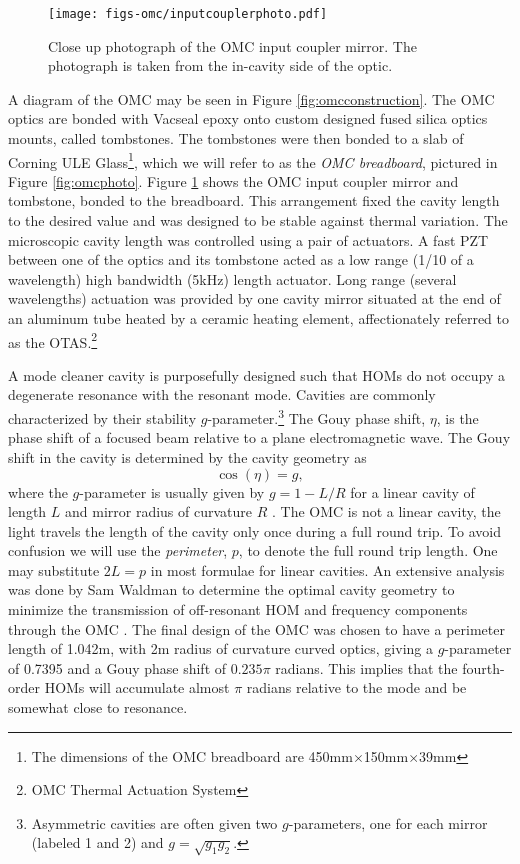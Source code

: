 \begin{figure}
  \begin{center}
  \leavevmode
  \texttt{[image: figs-omc/inputcouplerphoto.pdf]}
  \end{center}
  \caption[Close up photograph of the OMC input coupler mirror.]{Close up photograph of the OMC input coupler mirror. The photograph is taken from the in-cavity side of the optic.}
  \label{fig:inputcouplerphoto}
\end{figure}

A diagram of the OMC may be seen in Figure \ref{fig:omcconstruction}. %
The OMC optics are bonded with Vacseal epoxy onto custom designed fused silica optics mounts, called tombstones. %
 The tombstones were then bonded to a slab of Corning ULE Glass\footnote{The dimensions of the OMC breadboard are 450mm$\times$150mm$\times$39mm}, which we will refer to as the \emph{OMC breadboard}, pictured in Figure \ref{fig:omcphoto}. %
Figure \ref{fig:inputcouplerphoto} shows the OMC input coupler mirror and tombstone, bonded to the breadboard. %
This arrangement fixed the cavity length to the desired value and was designed to be stable against thermal variation. %
The microscopic cavity length was controlled using a pair of actuators. %
A fast PZT between one of the optics and its tombstone acted as a low range (1/10 of a wavelength) high bandwidth (5kHz) length actuator. %
Long range (several wavelengths) actuation was provided by one cavity mirror situated at the end of an aluminum tube heated by a ceramic heating element, affectionately referred to as the OTAS.\footnote{OMC Thermal Actuation System}

A mode cleaner cavity is purposefully designed such that HOMs do not occupy a degenerate resonance with the resonant  mode. %
Cavities are commonly characterized by their stability $g$-parameter.\footnote{Asymmetric cavities are often given two $g$-parameters, one for each mirror (labeled 1 and 2) and $g=\sqrt{g_1 g_2}$.} The Gouy phase shift, $\eta$, is the phase shift of a focused  beam relative to a plane electromagnetic wave. %
The Gouy shift in the cavity is determined by the cavity geometry as
\begin{equation}
\label{eqn:gouyg}
\cos(\eta)=g,
\end{equation}
where the $g$-parameter is usually given by $g=1-L/R$ for a linear cavity of length $L$ and mirror radius of curvature $R$ \cite{T080208}. %
The OMC is not a linear cavity, the light travels the length of the cavity only once during a full round trip. %
To avoid confusion we will use the \emph{perimeter}, $p$, to denote the full round trip length. %
One may substitute $2L=p$ in most formulae for linear cavities. %
An extensive analysis was done by Sam Waldman to determine the optimal cavity geometry to minimize the transmission of off-resonant HOM and frequency components through the OMC \cite{T080144}. %
The final design of the OMC was chosen to have a perimeter length of 1.042m, with 2m radius of curvature curved optics, giving a $g$-parameter of 0.7395 and a Gouy phase shift of $0.235\pi$ radians. %
This implies that the fourth-order HOMs will accumulate almost $\pi$ radians relative to the  mode and be somewhat close to resonance.

